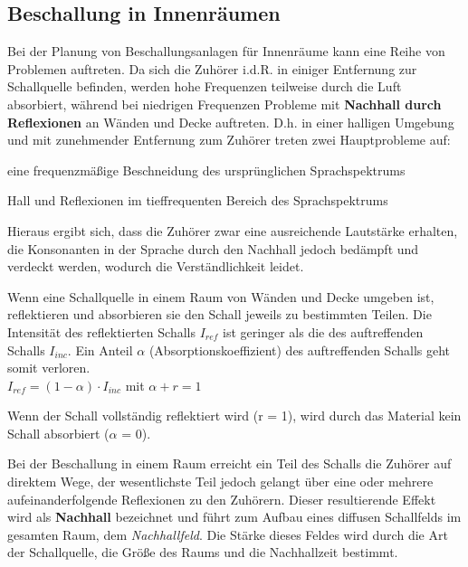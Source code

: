 \subsection{Beschallung in Innenräumen}
\label{sub:in Innenraeumen}
Bei der Planung von Beschallungsanlagen für Innenräume kann eine Reihe von Problemen auftreten. Da sich die Zuhörer i.d.R. in einiger Entfernung zur Schallquelle befinden, werden hohe Frequenzen teilweise durch die Luft absorbiert, während bei niedrigen Frequenzen Probleme mit \textbf{Nachhall durch Reflexionen} an Wänden und Decke auftreten. D.h. in einer halligen Umgebung und mit zunehmender Entfernung zum Zuhörer treten zwei Hauptprobleme auf:
\begin{compactenum}
\item eine frequenzmäßige Beschneidung des ursprünglichen Sprachspektrums
\item Hall und Reflexionen im tieffrequenten Bereich des Sprachspektrums
\end{compactenum}
Hieraus ergibt sich, dass die Zuhörer zwar eine ausreichende Lautstärke erhalten, die Konsonanten in der Sprache durch den Nachhall jedoch bedämpft und verdeckt werden, wodurch die Verständlichkeit leidet.

Wenn eine Schallquelle in einem Raum von Wänden und Decke umgeben ist, reflektieren und absorbieren sie den Schall jeweils zu bestimmten Teilen. Die Intensität des reflektierten Schalls $I_{ref}$ ist geringer als die des auftreffenden Schalls $I_{inc}$. Ein Anteil $\alpha$ (Absorptionskoeffizient) des auftreffenden Schalls geht somit verloren.\\ [1em]
$I_{ref} = (1-\alpha)\cdot I_{inc}$ mit $\alpha + r = 1$

Wenn der Schall vollständig reflektiert wird (r = 1), wird durch das Material kein Schall absorbiert ($\alpha$ = 0).

Bei der Beschallung in einem Raum erreicht ein Teil des Schalls die Zuhörer auf direktem Wege, der wesentlichste Teil jedoch gelangt über eine oder mehrere aufeinanderfolgende Reflexionen zu den Zuhörern. Dieser resultierende Effekt wird als \textbf{Nachhall} bezeichnet und führt zum Aufbau eines diffusen Schallfelds im gesamten Raum, dem \textit{Nachhallfeld}. Die Stärke dieses Feldes wird durch die Art der Schallquelle, die Größe des Raums und die Nachhallzeit bestimmt.

